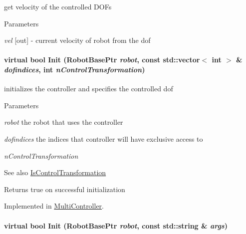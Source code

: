 get velocity of the controlled DOFs 


\begin{DoxyParams}{Parameters}
\item[{\em vel}]\mbox{[}out\mbox{]} -\/ current velocity of robot from the dof \end{DoxyParams}
\hypertarget{classOpenRAVE_1_1ControllerBase_a27ba60fa2a3a9f63a64b127369482d9a}{
\paragraph[{Init}]{\setlength{\rightskip}{0pt plus 5cm}virtual bool Init (RobotBasePtr {\em robot}, \/  const std::vector$<$ int $>$ \& {\em dofindices}, \/  int {\em nControlTransformation})}\hfill}
\label{classOpenRAVE_1_1ControllerBase_a27ba60fa2a3a9f63a64b127369482d9a}


initializes the controller and specifies the controlled dof 


\begin{DoxyParams}{Parameters}
\item[{\em robot}]the robot that uses the controller \item[{\em dofindices}]the indices that controller will have exclusive access to \item[{\em nControlTransformation}]\end{DoxyParams}
\begin{DoxySeeAlso}{See also}
\hyperlink{classOpenRAVE_1_1ControllerBase_af577c7692eed532e6ed26db3dca5ef47}{IsControlTransformation} 
\end{DoxySeeAlso}
\begin{DoxyReturn}{Returns}
true on successful initialization 
\end{DoxyReturn}


Implemented in \hyperlink{classOpenRAVE_1_1MultiController_ad5666862ecbce5aee42019ec18687268}{MultiController}.

\hypertarget{classOpenRAVE_1_1ControllerBase_ae61f45e499ec45a2b70ae3a1af53101b}{
\paragraph[{Init}]{\setlength{\rightskip}{0pt plus 5cm}virtual bool Init (RobotBasePtr {\em robot}, \/  const std::string \& {\em args})}\hfill}
\label{classOpenRAVE_1_1ControllerBase_ae61f45e499ec45a2b70ae3a1af53101b}


